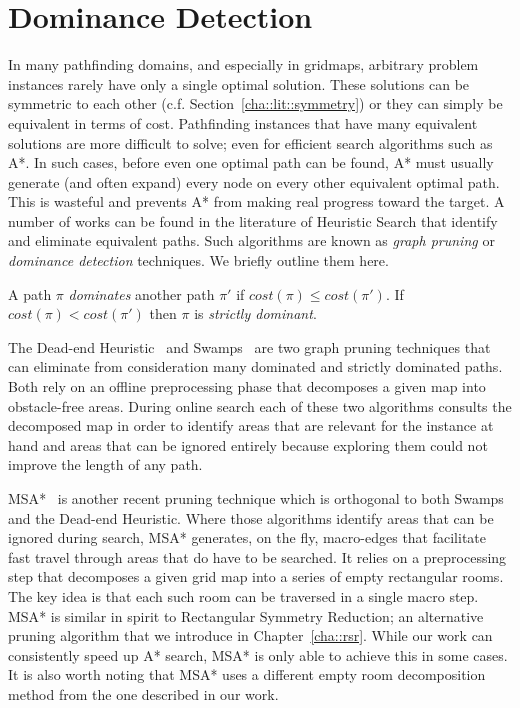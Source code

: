 \section{Dominance Detection}
\label{cha::lit::dominance}
In many pathfinding domains, and especially in gridmaps, arbitrary problem
instances rarely have only a single optimal solution. These solutions can be
symmetric to each other (c.f. Section~\ref{cha::lit::symmetry}) or they can
simply be equivalent in terms of cost.  Pathfinding instances that have many
equivalent solutions are more difficult to solve; even for efficient search
algorithms such as A{*}. In such cases, before even one optimal path can be
found, A{*} must usually generate (and often expand) every node on every other
equivalent optimal path.  This is wasteful and prevents A{*} from making real
progress toward the target.  A number of works can be found in the literature
of Heuristic Search that identify and eliminate equivalent paths. Such
algorithms are known as \emph{graph pruning} or \emph{dominance detection}
techniques. We briefly outline them here.

\begin{definition}
A path $\pi$ \emph{dominates} another path $\pi'$ if $cost(\pi) \leq cost(\pi')$. 
If $cost(\pi) < cost(\pi')$ then $\pi$ is \emph{strictly dominant}.
\end{definition}

The Dead-end Heuristic~\citep{bjornsson06} and
Swamps~\citep{pochter09,pochter10} are two graph pruning techniques that can
eliminate from consideration many dominated and strictly dominated paths.
Both rely on an offline preprocessing phase that decomposes a given map into
obstacle-free areas.  During online search each of these two algorithms
consults the decomposed map in order to identify areas that are relevant for
the instance at hand and areas that can be ignored entirely because exploring
them could not improve the length of any path.

MSA{*}~\citep{bolanca09} is another recent pruning technique which is
orthogonal to both Swamps and the Dead-end Heuristic.  Where those algorithms
identify areas that can be ignored during search, MSA{*} generates, on the
fly, macro-edges that facilitate fast travel through areas that do have to be
searched.  It relies on a preprocessing step that decomposes a given grid map
into a series of empty rectangular rooms. The key idea is that each such room
can be traversed in a single macro step. MSA{*} is similar in spirit to
Rectangular Symmetry Reduction; an alternative pruning algorithm that we
introduce in Chapter~\ref{cha::rsr}.  While our work can consistently speed up
A{*} search, MSA{*} is only able to achieve this in some cases.  It is also
worth noting that MSA{*} uses a different empty room decomposition method from
the one described in our work.

